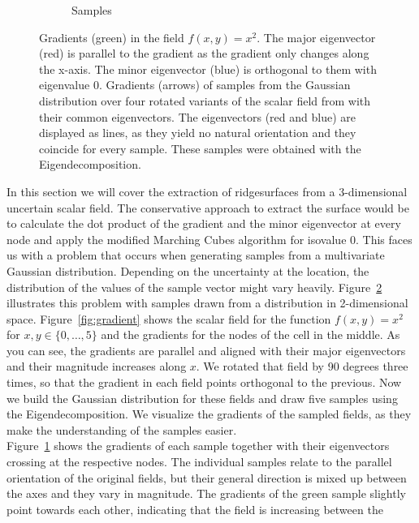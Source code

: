 \begin{figure}[ht]
\begin{subfigure}[b]{0.49\textwidth}
        \caption{Samples}
        \label{fig:samples}
    \end{subfigure}
    \caption{ Gradients (green) in the field
    $f(x,y)=x^2$. The major eigenvector (red) is parallel to the
    gradient as the gradient only changes along the x-axis. The minor
    eigenvector (blue) is orthogonal to them with eigenvalue 0.
     Gradients (arrows) of samples from the Gaussian
    distribution over four rotated variants of the scalar field from
     with their common eigenvectors. The
    eigenvectors (red and blue) are displayed as lines, as they yield no
    natural orientation and they coincide for every sample. These
    samples were obtained with the Eigendecomposition.}
    \label{fig:sampComp}
\end{figure}
\indent In this section we will cover the extraction of ridgesurfaces
from a 3-dimensional uncertain scalar field. The conservative approach
to extract the surface would be to calculate the dot product of the
gradient and the minor eigenvector at every node and apply the modified
Marching Cubes algorithm for isovalue 0. This faces us with a problem
that occurs when generating samples from a multivariate Gaussian
distribution. Depending on the uncertainty at the location, the
distribution of the values of the sample vector might vary heavily.
Figure~\ref{fig:sampComp} illustrates this problem with samples drawn
from a distribution in 2-dimensional space. Figure~\ref{fig:gradient}
shows the scalar field for the function $f(x,y) = x^2$ for $x, y \in
\{0,\dots,5\}$ and the gradients for the nodes of the cell in the
middle. As you can see, the gradients are parallel and aligned with
their major eigenvectors and their magnitude increases along $x$. We
rotated that field by 90 degrees three times, so that the gradient in
each field points orthogonal to the previous. Now we build the Gaussian
distribution for these fields and draw five samples using the
Eigendecomposition. We visualize the gradients of the sampled fields, as
they make the understanding of the samples easier.\\
\indent Figure~\ref{fig:samples} shows the gradients of each sample
together with their eigenvectors crossing at the respective nodes. The
individual samples relate to the parallel orientation of the original
fields, but their general direction is mixed up between the axes and
they vary in magnitude. The gradients of the green sample slightly point
towards each other, indicating that the field is increasing between the
